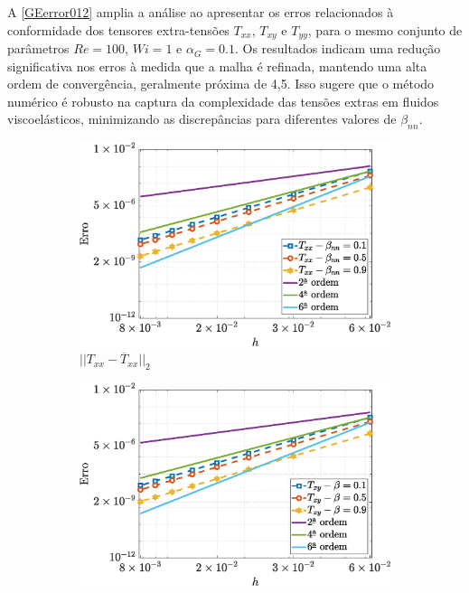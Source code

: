 A \autoref{GEerror012} amplia a análise ao apresentar os erros relacionados à conformidade dos tensores extra-tensões $T_{xx}$, $T_{xy}$ e $T_{yy}$, para o mesmo conjunto de parâmetros $Re = 100$, $Wi = 1$ e $\alpha_G = 0.1$. Os resultados indicam uma redução significativa nos erros à medida que a malha é refinada, mantendo uma alta ordem de convergência, geralmente próxima de 4,5. Isso sugere que o método numérico é robusto na captura da complexidade das tensões extras em fluidos viscoelásticos, minimizando as discrepâncias para diferentes valores de $\beta_{nn}$.
\begin{figure}[H]
    \centering
    \caption{Erro para os componentes tensores extra-tensão, usando os parâmetros $Re=100,$ $Wi=1$ e $\alpha_{G} = 0.1$, para o fluxo de fluido viscoelástico com o modelo Giesekus}\label{GEerror012}
    \begin{subfigure}[b]{.47\textwidth}
        \includegraphics[width=\textwidth]{figures/Case12/Giesekus/Errors/NormErr_2nd_Re_100_Wi_1_epsilon_0_xi_0_alphaG_0.1_Dt_1e-06_at_0.05_tipsim_1_MMS_12_Txx.eps}
        \caption{$||T_{xx} - \overline{T}_{xx}||_{2}$}
        \label{error_txx_2nd_Case1_giesekus_alphaG_0.1}
    \end{subfigure}
    \vspace{0.2cm}
    \qquad
    \begin{subfigure}[b]{.47\textwidth}
        \includegraphics[width=\textwidth]{figures/Case12/Giesekus/Errors/NormErr_2nd_Re_100_Wi_1_epsilon_0_xi_0_alphaG_0.1_Dt_1e-06_at_0.05_tipsim_1_MMS_12_Txy.eps}

\end{subfigure}
\end{figure}
